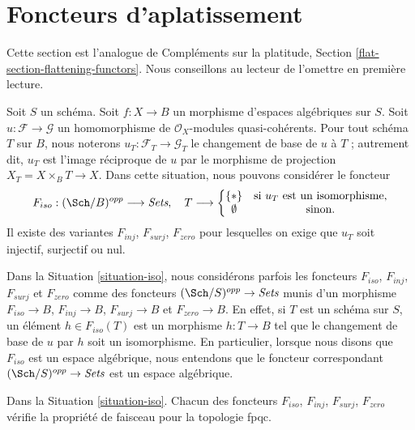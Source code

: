 \section{Foncteurs d'aplatissement}
\label{section-F-zero}

\noindent
Cette section est l'analogue de
Compléments sur la platitude, Section \ref{flat-section-flattening-functors}.
Nous conseillons au lecteur de l'omettre en première lecture.

\begin{situation}
\label{situation-iso}
Soit $S$ un schéma.
Soit $f : X \to B$ un morphisme d'espaces algébriques sur $S$.
Soit $u : \mathcal{F} \to \mathcal{G}$ un homomorphisme de
$\mathcal{O}_X$-modules quasi-cohérents. Pour tout schéma $T$ sur
$B$, nous noterons $u_T : \mathcal{F}_T \to \mathcal{G}_T$ le
changement de base de $u$ à $T$ ; autrement dit, $u_T$ est l'image réciproque
de $u$ par le morphisme de projection $X_T = X \times_B T \to X$.
Dans cette situation, nous pouvons considérer le foncteur
\begin{equation}
\label{equation-iso}
F_{iso} : (\Sch/B)^{opp} \longrightarrow \textit{Sets}, \quad
T \longrightarrow \left\{
\begin{matrix}
\{*\} & \text{si }u_T\text{ est un isomorphisme}, \\
\emptyset & \text{sinon.}
\end{matrix}
\right.
\end{equation}
Il existe des variantes $F_{inj}$, $F_{surj}$, $F_{zero}$ pour lesquelles on exige que
$u_T$ soit injectif, surjectif ou nul.
\end{situation}

\noindent
Dans la Situation \ref{situation-iso}, nous considérons parfois les foncteurs
$F_{iso}$, $F_{inj}$, $F_{surj}$ et $F_{zero}$ comme des foncteurs
$(\Sch/S)^{opp} \to \textit{Sets}$ munis d'un morphisme
$F_{iso} \to B$, $F_{inj} \to B$, $F_{surj} \to B$ et $F_{zero} \to B$.
En effet, si $T$ est un schéma sur $S$, un élément $h \in F_{iso}(T)$
est un morphisme $h : T \to B$
tel que le changement de base de $u$ par $h$ soit un isomorphisme.
En particulier, lorsque nous disons
que $F_{iso}$ est un espace algébrique, nous entendons que le foncteur
correspondant $(\Sch/S)^{opp} \to \textit{Sets}$ est un espace algébrique.

\begin{lemma}
\label{lemma-iso-sheaf}
Dans la Situation \ref{situation-iso}.
Chacun des foncteurs $F_{iso}$, $F_{inj}$, $F_{surj}$, $F_{zero}$
vérifie la propriété de faisceau pour la topologie fpqc.
\end{lemma}

